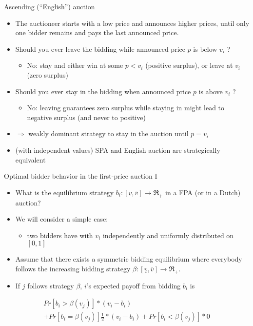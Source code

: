 \documentclass[bigger]{beamer}
\newcommand{\Ra}{\Rightarrow} \newcommand{\ra}{\rightarrow} \newcommand{\Lra}{\Leftrightarrow}
\begin{document}
\begin{frame}[label={sec:org16cc35f}]{Ascending (“English”) auction}
\begin{itemize}
\item The auctioneer starts with a low price and announces higher prices, until only one bidder remains and pays the last announced price.
\item Should you ever leave the bidding while announced price \(p\) is below \(v_i\) ?
\begin{itemize}
\item No: stay and either win at some \(p < v_i\) (positive surplus), or leave at \(v_i\) (zero surplus)
\pause
\end{itemize}
\item Should you ever stay in the bidding when announced price \(p\) is above \(v_i\) ?
\begin{itemize}
\item No: leaving guarantees zero surplus while staying in might lead to negative surplus (and never to positive)
\end{itemize}
\item \(\Ra\) weakly dominant strategy to stay in the auction until \(p = v_i\)
\item (with independent values) SPA and English auction are strategically equivalent
\end{itemize}
\end{frame}

\begin{frame}[label={sec:org28b4086}]{Optimal bidder behavior in the ﬁrst-price auction I}
\begin{itemize}
\item What is the equilibrium strategy \(b_i:[\underline v,\bar v]\ra\Re_+\) in a FPA (or in a Dutch) auction?
\item We will consider a simple case:
\begin{itemize}
\item two bidders have with \(v_i\) independently and uniformly distributed on \([0, 1]\)
\end{itemize}
\item Assume that there exists a symmetric bidding equilibrium where everybody follows the increasing bidding strategy \(\beta: [\underline v,\bar v]\ra\Re_+\).
\item If \(j\) follows strategy \(\beta\), \(i\)'s expected payoff from bidding \(b_i\) is
\end{itemize}
\begin{multline*}
Pr[b_i>\beta(v_j)]*(v_i-b_i) \\+ Pr[b_i=\beta(v_j)]\frac{1}{2}*(v_i-b_i)+Pr[b_i<\beta(v_j)]*0
\end{multline*}
\end{frame}
\end{document}
